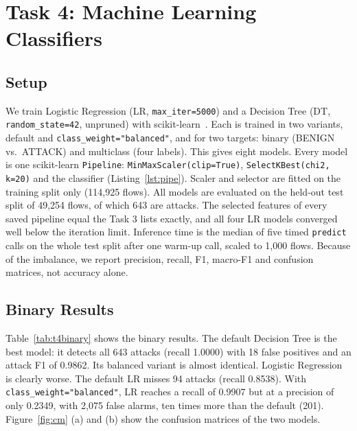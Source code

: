 \chapter{Task 4: Machine Learning Classifiers}\label{chap:task4_ml}

\section{Setup}\label{sec:ml-setup}

We train Logistic Regression (LR, \texttt{max\_iter=5000}) and a Decision Tree (DT, \texttt{random\_state=42}, unpruned) with scikit-learn~\cite{pedregosa2011sklearn}. Each is trained in two variants, default and \texttt{class\_weight="balanced"}, and for two targets: binary (BENIGN vs.\ ATTACK) and multiclass (four labels). This gives eight models. Every model is one scikit-learn \texttt{Pipeline}: \texttt{MinMaxScaler(clip=True)}, \texttt{SelectKBest(chi2, k=20)} and the classifier (Listing~\ref{lst:pipe}). Scaler and selector are fitted on the training split only (114,925 flows). All models are evaluated on the held-out test split of 49,254 flows, of which 643 are attacks. The selected features of every saved pipeline equal the Task 3 lists exactly, and all four LR models converged well below the iteration limit. Inference time is the median of five timed \texttt{predict} calls on the whole test split after one warm-up call, scaled to 1,000 flows. Because of the imbalance, we report precision, recall, F1, macro-F1 and confusion matrices, not accuracy alone.



\section{Binary Results}\label{sec:ml-binary}

Table~\ref{tab:t4binary} shows the binary results. The default Decision Tree is the best model: it detects all 643 attacks (recall 1.0000) with 18 false positives and an attack F1 of 0.9862. Its balanced variant is almost identical. Logistic Regression is clearly worse. The default LR misses 94 attacks (recall 0.8538). With \texttt{class\_weight="balanced"}, LR reaches a recall of 0.9907 but at a precision of only 0.2349, with 2,075 false alarms, ten times more than the default (201). Figure~\ref{fig:cm} (a) and (b) show the confusion matrices of the two models.

